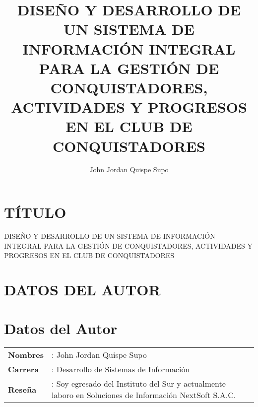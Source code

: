 \documentclass[stu, 12pt, letterpaper, donotrepeattitle, floatsintext, natbib]{apa7}
\title{\large DISE\~{N}O Y DESARROLLO DE UN SISTEMA DE INFORMACI\'ON INTEGRAL PARA LA GESTI\'ON DE CONQUISTADORES, ACTIVIDADES Y
PROGRESOS EN EL CLUB DE CONQUISTADORES}
\author{John Jordan Quispe Supo}
\begin{document}
\maketitle

\renewcommand\contentsname{\large\'Indice}
\tableofcontents
\setcounter{tocdepth}{2}
\newpage
\renewcommand\listfigurename{\large\'Indice de figuras}
\listoffigures
\newpage
\renewcommand\listtablename{\large\'Indice de tablas}
\listoftables
\newpage


\section{\large T\'ITULO}
\noindent DISE\~{N}O Y DESARROLLO DE UN SISTEMA DE INFORMACI\'ON INTEGRAL PARA LA GESTI\'ON DE CONQUISTADORES, ACTIVIDADES Y
PROGRESOS EN EL CLUB DE CONQUISTADORES

\section{\large DATOS DEL AUTOR}
\section{\large Datos del Autor}
\begin{tabular}{@{} p{3cm} p{11.8cm} @{}}
    \textbf{Nombres} & : John Jordan Quispe Supo                                                                              \\
    \textbf{Carrera} & : Desarrollo de Sistemas de Información                                                                \\
    \textbf{Reseña}  & : Soy egresado del Instituto del Sur y actualmente laboro en Soluciones de Información NextSoft S.A.C.
\end{tabular}
\end{document}
